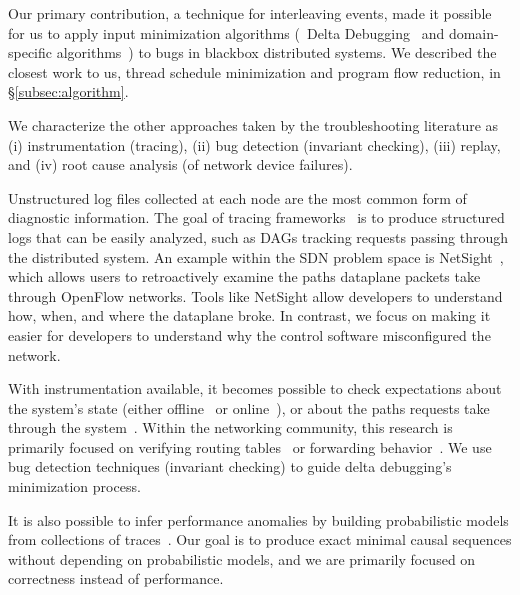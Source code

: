 Our primary contribution, a technique for interleaving events,
made it possible for us to apply input minimization algorithms (\cf~Delta
Debugging~\cite{Zeller:1999:YMP:318773.318946,Zeller:2002:SIF:506201.506206} and
domain-specific algorithms~\cite{claessen2000quickcheck,whitaker2004configuration,regehr2012test}) to bugs
in blackbox distributed systems. We described the closest work to us, thread schedule
minimization and program flow reduction, in \S\ref{subsec:algorithm}.

We characterize the other approaches taken by the troubleshooting literature
as (i) instrumentation (tracing),
(ii) bug detection (invariant checking),
(iii) replay, and
(iv) root cause analysis (of network device failures).

\vspace{0.05in}
 Unstructured
log files collected at each node are the most common form of diagnostic information. The goal of
tracing frameworks~\cite{pip,fonseca2007x,Chen02pinpoint:problem,ndb14,barham2004using}
is to produce structured logs that can be easily analyzed, such as DAGs tracking
requests passing through the distributed system. An example within the SDN
problem space is NetSight~\cite{ndb14}, which
allows users to retroactively examine the paths dataplane packets
take through OpenFlow networks. Tools like NetSight allow developers to understand
how, when, and where the dataplane broke. In contrast, we focus on making it
easier for developers to understand why the control software
misconfigured the network.%

\vspace{0.05in}
 With instrumentation available, it becomes possible
to check expectations about the
system's state (either offline~\cite{Liu07widschecker} or online~\cite{d3s}), or about the paths requests take through
the system~\cite{pip}. Within the networking community, this research is
primarily focused on verifying routing tables~\cite{hsa,hsa_realtime,anteater,khurshid2012veriflow}
or forwarding behavior~\cite{Zeng:2012:ATP:2413176.2413205,libra}.
We use bug detection techniques (invariant checking) to guide delta debugging's minimization
process.

It is also possible to infer
performance anomalies by building probabilistic models from
collections of traces~\cite{barham2004using,Chen02pinpoint:problem}.
Our goal is to produce exact minimal causal sequences without
depending on probabilistic models, and we are primarily focused on correctness
instead of performance.


